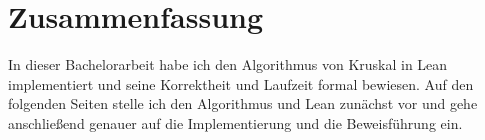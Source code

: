\section*{Zusammenfassung}
In dieser Bachelorarbeit habe ich den Algorithmus von Kruskal\cite{kruskal_wiki} in Lean\cite{10.1007/978-3-030-79876-5_37} implementiert und seine Korrektheit und Laufzeit formal bewiesen.
Auf den folgenden Seiten stelle ich den Algorithmus und Lean zunächst vor und gehe anschließend genauer auf die Implementierung und die Beweisführung ein.
